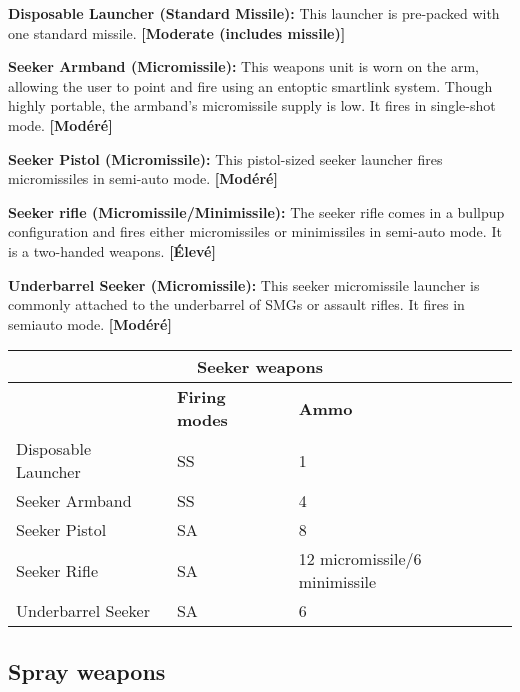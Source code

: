 {{\textbf{Disposable Launcher (Standard Missile):} This launcher is pre-packed with one standard missile. \textbf{[Moderate (includes missile)]} 

\textbf{Seeker Armband (Micromissile):} This weapons unit is worn on the arm, allowing the user to point and fire using an entoptic smartlink system. Though highly portable, the armband’s micromissile supply is low. It fires in single-shot mode. \textbf{[Modéré]} 

\textbf{Seeker Pistol (Micromissile):} This pistol-sized seeker launcher fires micromissiles in semi-auto mode. \textbf{[Modéré]} 

\textbf{Seeker rifle (Micromissile/Minimissile):} The seeker rifle comes in a bullpup configuration and fires either micromissiles or minimissiles in semi-auto mode. It is a two-handed weapons. \textbf{[Élevé]} 

\textbf{Underbarrel Seeker (Micromissile):} This seeker micromissile launcher is commonly attached to the underbarrel of SMGs or assault rifles. It fires in semiauto mode. \textbf{[Modéré]} 

\begin{table} \begin{tabular}{|l|l|l|} \hline

\multicolumn{3}{|c|}{\textbf{Seeker weapons}} \\ \hline

&\textbf{Firing modes}	&\textbf{Ammo} \\ \hline

Disposable Launcher	&SS	&1 \\ \hline

Seeker Armband	&SS	&4 \\ \hline

Seeker Pistol	&SA	&8 \\ \hline

Seeker Rifle	&SA	&12 micromissile/6 minimissile \\ \hline

Underbarrel Seeker	&SA	&6 \\ \hline

\end{tabular} \label{tab:seeker-weapons} \end{table} 



\subsection{Spray weapons} \label{sec:spray-weapons} 

}}

